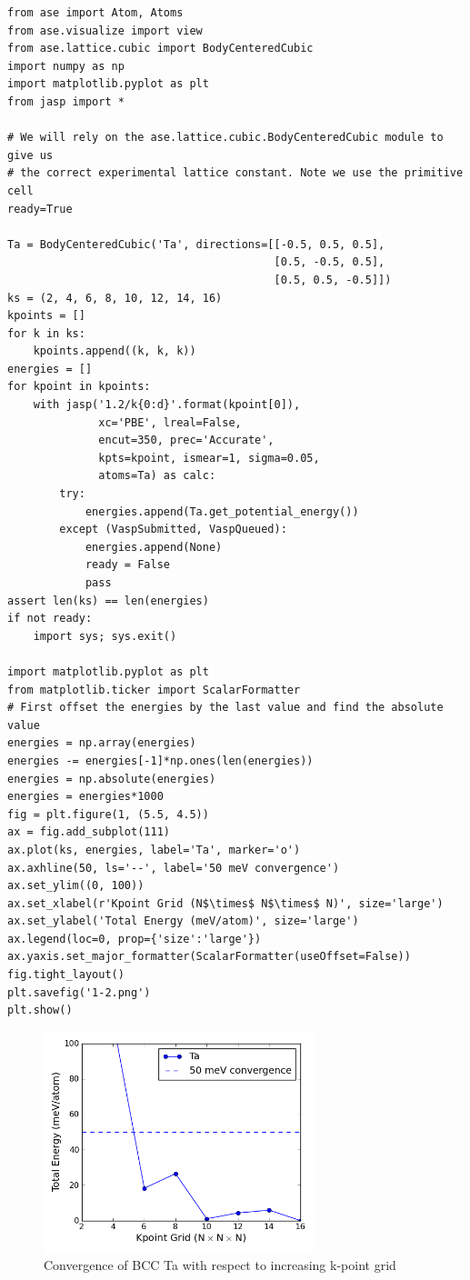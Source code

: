 \documentclass[11pt]{article}
\begin{document}
\begin{verbatim}
from ase import Atom, Atoms
from ase.visualize import view
from ase.lattice.cubic import BodyCenteredCubic
import numpy as np
import matplotlib.pyplot as plt
from jasp import *

# We will rely on the ase.lattice.cubic.BodyCenteredCubic module to give us
# the correct experimental lattice constant. Note we use the primitive cell
ready=True

Ta = BodyCenteredCubic('Ta', directions=[[-0.5, 0.5, 0.5],
                                         [0.5, -0.5, 0.5],
                                         [0.5, 0.5, -0.5]])
ks = (2, 4, 6, 8, 10, 12, 14, 16)
kpoints = []
for k in ks:
    kpoints.append((k, k, k))
energies = []
for kpoint in kpoints:
    with jasp('1.2/k{0:d}'.format(kpoint[0]),
              xc='PBE', lreal=False,
              encut=350, prec='Accurate',
              kpts=kpoint, ismear=1, sigma=0.05,
              atoms=Ta) as calc:
        try:
            energies.append(Ta.get_potential_energy())
        except (VaspSubmitted, VaspQueued):
            energies.append(None)
            ready = False
            pass
assert len(ks) == len(energies)
if not ready:
    import sys; sys.exit()

import matplotlib.pyplot as plt
from matplotlib.ticker import ScalarFormatter
# First offset the energies by the last value and find the absolute value
energies = np.array(energies)
energies -= energies[-1]*np.ones(len(energies))
energies = np.absolute(energies)
energies = energies*1000
fig = plt.figure(1, (5.5, 4.5))
ax = fig.add_subplot(111)
ax.plot(ks, energies, label='Ta', marker='o')
ax.axhline(50, ls='--', label='50 meV convergence')
ax.set_ylim((0, 100))
ax.set_xlabel(r'Kpoint Grid (N$\times$ N$\times$ N)', size='large')
ax.set_ylabel('Total Energy (meV/atom)', size='large')
ax.legend(loc=0, prop={'size':'large'})
ax.yaxis.set_major_formatter(ScalarFormatter(useOffset=False))
fig.tight_layout()
plt.savefig('1-2.png')
plt.show()
\end{verbatim}


\begin{figure}[H]
\centering
\includegraphics[width=0.7\textwidth]{./1-2.png}
\caption{Convergence of BCC Ta with respect to increasing k-point grid}
\end{figure}
\end{document}
